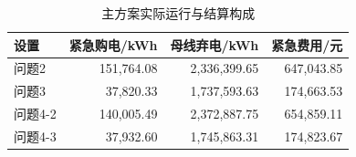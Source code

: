 \begin{table}[H]\centering\small\caption{主方案实际运行与结算构成}\label{tab:operations}
\begin{tabular}{lrrr}\toprule
设置 & 紧急购电/kWh & 母线弃电/kWh & 紧急费用/元\\\midrule
问题2 & 151,764.08 & 2,336,399.65 & 647,043.85\\
问题3 & 37,820.33 & 1,737,593.63 & 174,663.53\\
问题4-2 & 140,005.49 & 2,372,887.75 & 654,859.11\\
问题4-3 & 37,932.60 & 1,745,863.31 & 174,823.67\\
\bottomrule\end{tabular}\end{table}
